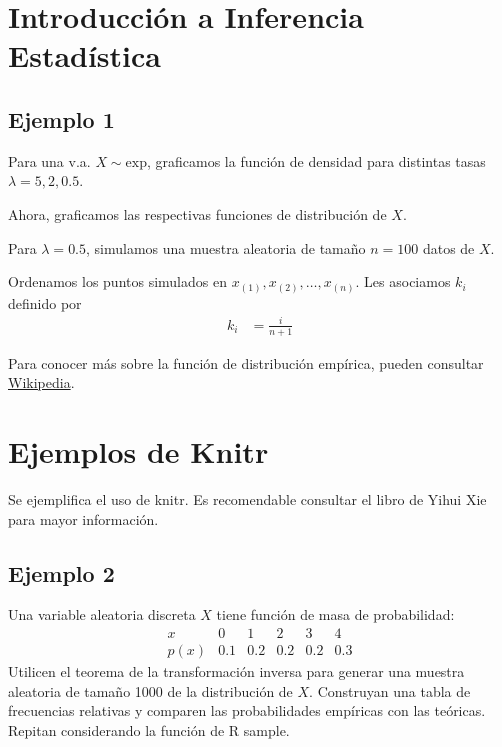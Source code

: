 \documentclass[10pt]{article}\usepackage[]{graphicx}\usepackage[]{xcolor}
\begin{document}
\section{Introducción a Inferencia Estadística}

\subsection{Ejemplo 1}

Para una v.a. $X\sim \mathrm{exp}$, graficamos la función de densidad para distintas tasas $\lambda = 5, 2, 0.5$.








Ahora, graficamos las respectivas funciones de distribución de $X$.






Para $\lambda=0.5$, simulamos una muestra aleatoria de tamaño $n=100$ datos de $X$.




Ordenamos los puntos simulados en $x_{(1)},x_{(2)}, \ldots, x_{(n)}$. Les asociamos $k_i$ definido por
\begin{align}
k_i &= \frac{i}{n+1}
\end{align}



Para conocer más sobre la función de distribución empírica, pueden consultar \href{https://en.wikipedia.org/wiki/Empirical_distribution_function}{Wikipedia}.
\section{Ejemplos de Knitr}
Se ejemplifica el uso de knitr. Es recomendable consultar el libro de Yihui Xie \cite{Xie2015} para mayor información.
\subsection{Ejemplo 2}
Una variable aleatoria discreta $X$ tiene función de masa de probabilidad:
$$
\begin{array}{cccccc}{x} & {0} & {1} & {2} & {3} & {4} \\ \hline p(x) & {0.1} & {0.2} & {0.2} & {0.2} & {0.3}\end{array}
$$
Utilicen el teorema de la transformación inversa para generar una muestra aleatoria de tamaño 1000 de la distribución de $X$. Construyan una tabla de frecuencias relativas y comparen las probabilidades empíricas con las teóricas.\\
Repitan considerando la función de R sample.
\end{document}
